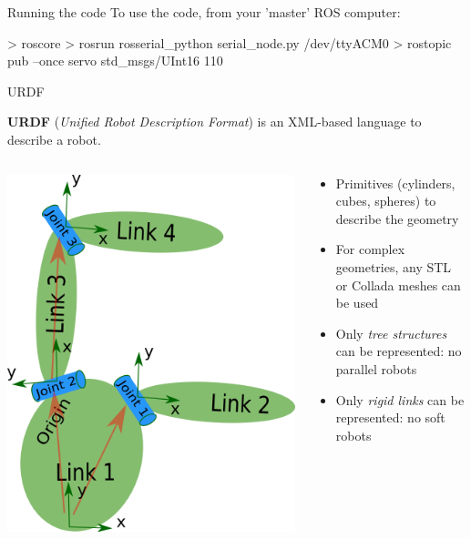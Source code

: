 \documentclass[compress]{beamer}
\begin{document}
\begin{frame}[fragile]{Running the code}
    To use the code, from your 'master' ROS computer:

\begin{shcode}
> roscore
> rosrun rosserial_python serial_node.py /dev/ttyACM0
> rostopic pub --once servo std_msgs/UInt16 110
\end{shcode}
\end{frame}


\begin{frame}{URDF}

        \textbf{URDF} (\emph{Unified Robot Description Format}) is an XML-based language
        to describe a robot.

        \begin{columns}
            \begin{column}{0.5\linewidth}
        \begin{center}
            \includegraphics[width=0.8\linewidth]{link}
        \end{center}
                
            \end{column}
            \begin{column}{0.5\linewidth}
        \begin{itemize}
                \small
            \item Primitives (cylinders, cubes, spheres) to describe the
                geometry
            \item For complex geometries, any STL or Collada meshes can be used
            \item Only \emph{tree structures} can be represented: no parallel robots
            \item Only \emph{rigid links} can be represented: no soft robots
        \end{itemize}
            \end{column}
        \end{columns}
\end{frame}
\end{document}
